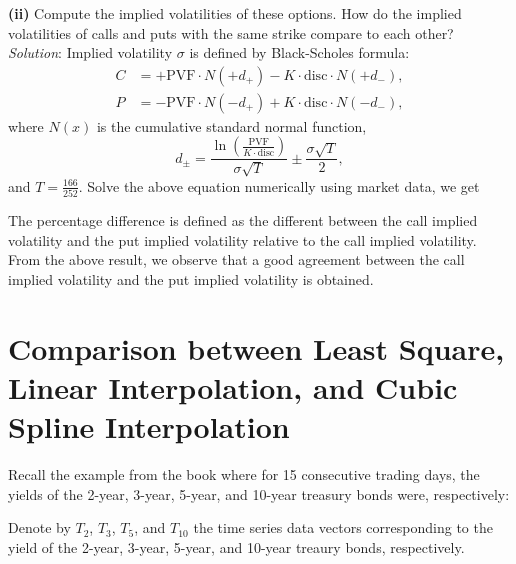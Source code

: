 \documentclass[paper=a4, fontsize=11pt]{scrartcl} %
\numberwithin{equation}{section} %
\numberwithin{figure}{section} %
\numberwithin{table}{section} %
\begin{document}
\textbf{(ii)} Compute the implied volatilities of these options. How do the implied volatilities of calls and puts with the same strike compare to each other?\\
\textit{Solution}: Implied volatility $\sigma$ is defined by Black-Scholes formula:
\begin{align}
\nonumber C &= +\text{PVF}\cdot N(+d_+) - K\cdot \text{disc}\cdot N(+d_-),\\
\nonumber P &= -\text{PVF}\cdot  N(-d_+) + K\cdot \text{disc}\cdot N(-d_-),
\end{align}
where $N(x)$ is the cumulative standard normal function,
$$
d_{\pm} = \frac{ \ln\left( \frac{\text{PVF}}{K\cdot\text{disc} }\right) }{\sigma\sqrt{T}} \pm 
\frac{\sigma\sqrt{T}}{2},
$$
and $T=\frac{166}{252}$. Solve the above equation numerically using market data, we get
\begin{center}
{
}
\end{center}
The percentage difference is defined as the different between the call implied volatility and the put implied volatility relative to the call implied volatility. From the above result, we observe that a good agreement between the call implied volatility and the put implied volatility is obtained.

\newpage

\section{Comparison between Least Square, Linear Interpolation, and Cubic Spline Interpolation}
Recall the example from the book where for 15 consecutive trading days, the yields of the 
2-year, 3-year, 5-year, and 10-year treasury bonds were, respectively:
\begin{center}
{\footnotesize
{}
}
\end{center}
Denote by $T_2$, $T_3$, $T_5$, and $T_{10}$ the time series data  vectors corresponding to
the yield of the 2-year, 3-year, 5-year, and 10-year treaury bonds, respectively.
\end{document}
